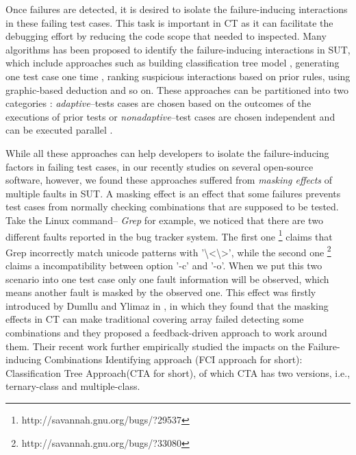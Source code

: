 \documentclass{sig-alternate}
\begin{document}
Once failures are detected, it is desired to isolate the failure-inducing interactions in these failing test cases. This task is important in CT as it can facilitate the debugging effort by reducing the code scope that needed to inspected. Many algorithms has been proposed to identify the failure-inducing interactions in SUT, which include approaches such as building classification tree model \cite{yilmaz2006covering}, generating one test case one time \cite{nie2011minimal}, ranking suspicious interactions based on prior rules\cite{ghandehari2012identifying}, using graphic-based deduction \cite{martinez2008algorithms} and so on. These approaches can be partitioned into two categories \cite{colbourn2008locating}: \emph{adaptive}--tests cases are chosen based on the outcomes of the executions of prior tests \cite{nie2011minimal,ghandehari2012identifying,niu2013identifying,zhang2011characterizing,shakya2012isolating,wang2010adaptive,li2012improved}or \emph{nonadaptive}--test cases are chosen independent and can be executed parallel \cite{yilmaz2006covering,colbourn2008locating,martinez2008algorithms,martinez2009locating,fouche2009incremental}.


While all these approaches can help developers to isolate the failure-inducing factors in failing test cases, in our recently studies on several open-source software, however, we found these approaches suffered from \emph{masking effects} of multiple faults in SUT. A masking effect \cite{dumlu2011feedback,yilmaz2013reducing} is an effect that some failures prevents test cases from normally checking combinations that are supposed to be tested. Take the Linux command-- \emph{Grep} for example, we noticed that there are two different faults reported in the bug tracker system. The first one \footnote{http://savannah.gnu.org/bugs/?29537}  claims that Grep incorrectly match unicode patterns with '\textbackslash<\textbackslash>', while the second one \footnote{http://savannah.gnu.org/bugs/?33080} claims a incompatibility between option '-c' and '-o'. When we put this two scenario into one test case only one fault information will be observed, which means another fault is masked by the observed one. This effect was firstly introduced by Dumllu and Ylimaz in \cite{dumlu2011feedback}, in which they found that the masking effects in CT can make traditional covering array failed detecting some combinations and they proposed a feedback-driven approach to work around them. Their recent work \cite{yilmaz2013reducing} further empirically studied the impacts on the Failure-inducing Combinations Identifying approach (FCI approach for short):  Classification Tree Approach(CTA for short)\cite{yilmaz2006covering}, of which CTA has two versions, i.e., ternary-class and multiple-class.
\end{document}
